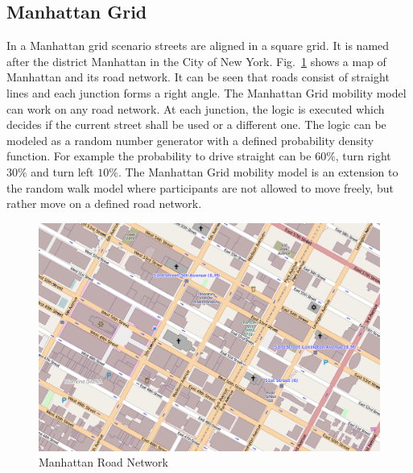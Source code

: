 \documentclass[master,english]{hgbthesis}
\begin{document}
\subsection{Manhattan Grid}
In a Manhattan grid scenario streets are aligned in a square grid. It is named after the district Manhattan in the City of New York. Fig.\ \ref{fig:manhattan} shows a map of Manhattan and its road network. It can be seen that roads consist of straight lines and each junction forms a right angle.
The Manhattan Grid mobility model can work on any road network. At each junction, the logic is executed which decides if the current street shall be used or a different one. The logic can be modeled as a random number generator with a defined probability density function. For example the probability to drive straight can be $60\%$, turn right $30\%$ and turn left $10\%$. The Manhattan Grid mobility model is an extension to the random walk model where participants are not allowed to move freely, but rather move on a defined road network.
\begin{figure}
	\centering
	\includegraphics[width=\linewidth]{./images/manhattan}
	\caption{Manhattan Road Network}
	\label{fig:manhattan}
\end{figure}
\end{document}
